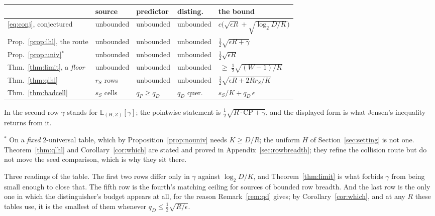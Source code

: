 \documentclass{aicr-solution}
\newcommand{\CP}{\mathrm{CP}}
\begin{document}
\begin{center}\small
\begin{tabular}{@{}lllll@{}}
\toprule
 & source & predictor & disting. & the bound \\
\midrule
\eqref{eq:conj}, conjectured        & unbounded    & unbounded      & unbounded    & $c\bigl(\sqrt{\epsilon R} + \sqrt{\log_2 D/K}\bigr)$ \\
Prop.~\ref{prop:lhl}, the route     & unbounded    & unbounded      & unbounded    & $\tfrac12\sqrt{\epsilon R + \gamma}$ \\
Prop.~\ref{prop:univ}$^{\ast}$      & unbounded    & unbounded      & unbounded    & $\tfrac12\sqrt{\epsilon R}$ \\
Thm.~\ref{thm:limit}, a \emph{floor}& unbounded    & unbounded      & unbounded    & $\ \ge\;\tfrac12\sqrt{(W-1)/K}$ \\
Thm.~\ref{thm:qlhl}                 & $r_S$ rows   & unbounded      & unbounded    & $\tfrac12\sqrt{\epsilon R + 2R r_S/K}$ \\
Thm.~\ref{thm:badcell}              & $s_S$ cells  & $q_P \ge q_D$  & $q_D$ quer.  & $s_S/K + q_D\,\epsilon$ \\
\bottomrule
\end{tabular}
\end{center}

\noindent In the second row $\gamma$ stands for $\mathbb{E}_{(H,Z)}[\gamma]$; the pointwise
statement is $\tfrac12\sqrt{R\cdot\CP + \gamma}$, and the displayed form is what Jensen's
inequality returns from it.

\smallskip
\noindent$^{\ast}$ On a \emph{fixed} $2$-universal table, which by Proposition~\ref{prop:nouniv}
needs $K \ge D/R$; the uniform $H$ of Section~\ref{sec:setting} is not one. Theorem~\ref{thm:qlhl}
and Corollary~\ref{cor:which} are stated and proved in Appendix~\ref{sec:rowbreadth}; they refine
the collision route but do not move the seed comparison, which is why they sit there.

\smallskip
Three readings of the table. The first two rows differ only in $\gamma$ against $\log_2 D/K$, and
Theorem~\ref{thm:limit} is what forbids $\gamma$ from being small enough to close that. The fifth
row is the fourth's matching ceiling for sources of bounded row breadth. And the last row is the
only one in which the distinguisher's budget appears at all, for the reason
Remark~\ref{rem:qd} gives; by Corollary~\ref{cor:which}, and at any $R$ these tables use, it is the
smallest of them whenever $q_D \le \tfrac12\sqrt{R/\epsilon}$.
\end{document}
